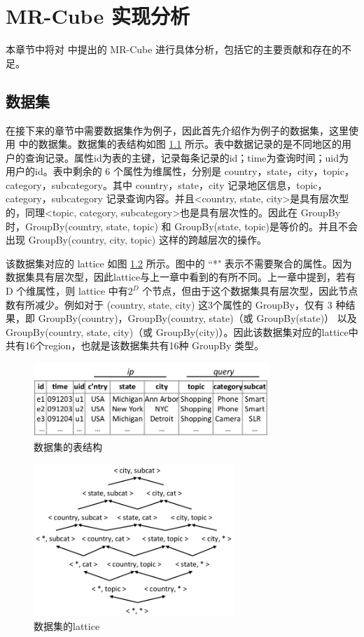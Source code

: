 \chapter{MR-Cube 实现分析}

本章节中将对 \cite{nandi2011distributed} 中提出的 MR-Cube 进行具体分析，包括它的主要贡献和存在的不足。

\section{数据集}

在接下来的章节中需要数据集作为例子，因此首先介绍作为例子的数据集，这里使用\cite{nandi2011distributed}  中的数据集。数据集的表结构如图 \ref{dataset_table4} 所示。表中数据记录的是不同地区的用户的查询记录。属性id为表的主键，记录每条记录的id；time为查询时间；uid为用户的id。表中剩余的 6 个属性为维属性，分别是 country，state，city，topic，category，subcategory。其中 country，state，city 记录地区信息，topic，category，subcategory 记录查询内容。并且\textless country, state, city\textgreater 是具有层次型的，同理\textless topic, category, subcategory\textgreater 也是具有层次性的。因此在 GroupBy 时，GroupBy(country, state, topic) 和 GroupBy(state, topic)是等价的。并且不会出现 GroupBy(country, city, topic) 这样的跨越层次的操作。

该数据集对应的 lattice 如图 \ref{dataset_lattice4} 所示。图中的 ``*" 表示不需要聚合的属性。因为数据集具有层次型，因此lattice与上一章中看到的有所不同。上一章中提到，若有 D 个维属性，则 lattice 中有${2}^{D}$ 个节点，但由于这个数据集具有层次型，因此节点数有所减少。例如对于 (country, state, city) 这3个属性的 GroupBy，仅有 3 种结果，即 GroupBy(country)，GroupBy(country, state)（或 GroupBy(state)） 以及 GroupBy(country, state, city)（或 GroupBy(city)）。因此该数据集对应的lattice中共有16个region，也就是该数据集共有16种 GroupBy 类型。


\begin{figure}[!htb]
\centering\includegraphics[width=3.5in]{picture/ch_datacube_mr/dataset_table} 
\caption{数据集的表结构}\label{dataset_table4} 
\end{figure} 

\begin{figure}[!htb]
\centering\includegraphics[width=3in]{picture/ch_datacube_mr/dataset_lattice} 
\caption{数据集的lattice}\label{dataset_lattice4} 
\end{figure} 

